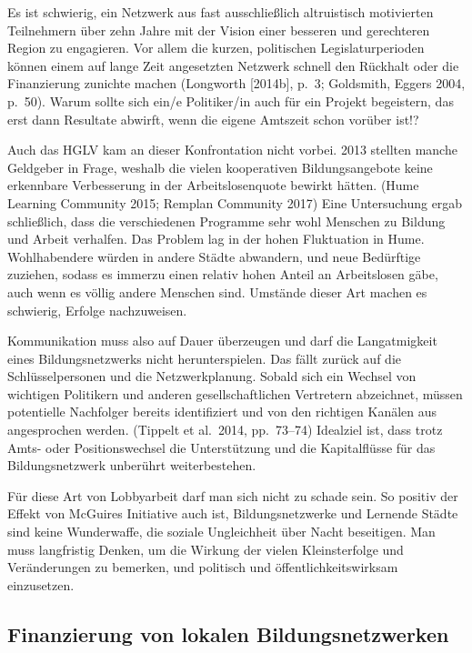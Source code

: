 \documentclass[a4paper,
fontsize=11pt,
oneside,
numbers=noperiodatend,
parskip=half-,
bibliography=totoc,
final
]{scrartcl}
\begin{document}
Es ist schwierig, ein Netzwerk aus fast ausschließlich altruistisch
motivierten Teilnehmern über zehn Jahre mit der Vision einer besseren
und gerechteren Region zu engagieren. Vor allem die kurzen, politischen
Legislaturperioden können einem auf lange Zeit angesetzten Netzwerk
schnell den Rückhalt oder die Finanzierung zunichte machen (Longworth
{[}2014b{]}, p.~3; Goldsmith, Eggers 2004, p.~50). Warum sollte sich
ein/e Politiker/in auch für ein Projekt begeistern, das erst dann
Resultate abwirft, wenn die eigene Amtszeit schon vorüber ist!?

Auch das HGLV kam an dieser Konfrontation nicht vorbei. 2013 stellten
manche Geldgeber in Frage, weshalb die vielen kooperativen
Bildungsangebote keine erkennbare Verbesserung in der Arbeitslosenquote
bewirkt hätten. (Hume Learning Community 2015; Remplan Community 2017)
Eine Untersuchung ergab schließlich, dass die verschiedenen Programme
sehr wohl Menschen zu Bildung und Arbeit verhalfen. Das Problem lag in
der hohen Fluktuation in Hume. Wohlhabendere würden in andere Städte
abwandern, und neue Bedürftige zuziehen, sodass es immerzu einen relativ
hohen Anteil an Arbeitslosen gäbe, auch wenn es völlig andere Menschen
sind. Umstände dieser Art machen es schwierig, Erfolge nachzuweisen.

Kommunikation muss also auf Dauer überzeugen und darf die Langatmigkeit
eines Bildungsnetzwerks nicht herunterspielen. Das fällt zurück auf die
Schlüsselpersonen und die Netzwerkplanung. Sobald sich ein Wechsel von
wichtigen Politikern und anderen gesellschaftlichen Vertretern
abzeichnet, müssen potentielle Nachfolger bereits identifiziert und von
den richtigen Kanälen aus angesprochen werden. (Tippelt et al.~2014,
pp.~73--74) Idealziel ist, dass trotz Amts- oder Positionswechsel die
Unterstützung und die Kapitalflüsse für das Bildungsnetzwerk unberührt
weiterbestehen.

Für diese Art von Lobbyarbeit darf man sich nicht zu schade sein. So
positiv der Effekt von McGuires Initiative auch ist, Bildungsnetzwerke
und Lernende Städte sind keine Wunderwaffe, die soziale Ungleichheit
über Nacht beseitigen. Man muss langfristig Denken, um die Wirkung der
vielen Kleinsterfolge und Veränderungen zu bemerken, und politisch und
öffentlichkeitswirksam einzusetzen.

\hypertarget{finanzierung-von-lokalen-bildungsnetzwerken}{%
\subsection*{Finanzierung von lokalen
Bildungsnetzwerken}\label{finanzierung-von-lokalen-bildungsnetzwerken}}
\end{document}
